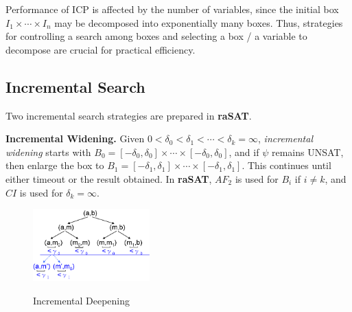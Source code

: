 \documentclass[runningheads,a4paper,oribibl]{llncs}
\begin{document}
Performance of ICP is affected by the number of variables, since the initial box 
$I_1 \times \cdots \times I_n$ may be decomposed into exponentially many boxes.
Thus, strategies for controlling a search among boxes and selecting a box / a variable
to decompose are crucial for practical efficiency. 

\subsection{Incremental Search} \label{sec:incsearch}

Two incremental search strategies are prepared in {\bf raSAT}. 

\medskip \noindent 
\textbf{Incremental Widening.}
Given $0 < \delta_0 < \delta_1 < \cdots < \delta_k = \infty$, 
{\em incremental widening} starts with 
$B_0 = [-\delta_0 , \delta_0] \times \cdots \times [-\delta_0 , \delta_0]$,
and if $\psi$ remains UNSAT, then enlarge the box to 
$B_1 = [-\delta_1 , \delta_1] \times \cdots \times [-\delta_1 , \delta_1]$.
This continues until either timeout or the result obtained. 
In {\bf raSAT}, $AF_2$ is used for $B_i$ if $i \neq k$, and $CI$ is used
for $\delta_k = \infty$. 

\begin{figure}
\vspace{-5mm}
\centering
\includegraphics[width=0.4\textwidth]{IncDeepen.png} \\
\caption{Incremental Deepening}
\label{fig:incwid}
\vspace{-3mm}
\end{figure}
\end{document}
